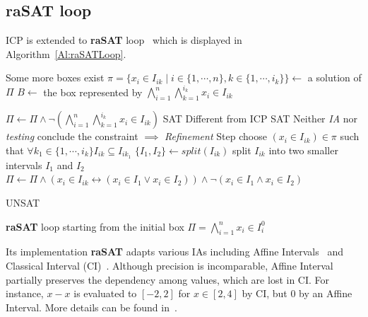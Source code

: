 \documentclass[runningheads,a4paper,oribibl]{llncs}
\begin{document}
\subsection{raSAT loop}
ICP is extended to {\bf raSAT} loop~\cite{VanKhanh201227} which is displayed in Algorithm~\ref{Al:raSATLoop}.  
\begin{algorithm}[hb]
\begin{algorithmic}[1]
 \Comment Some more boxes exist
\State $\pi = \{x_i \in I_{ik} \mid i \in \{1,\cdots, n\}, k \in \{1,\cdots, i_k\} \} \gets $
a solution of $\Pi$ 	
\State $B \gets $ the box represented by
$\bigwedge\limits_{i=1}^n\bigwedge\limits_{k=1}^{i_k}x_i \in I_{ik}$

\State $\Pi \gets \Pi \wedge \neg(\bigwedge\limits_{i=1}^n\bigwedge\limits_{k=1}^{i_k}x_i \in I_{ik})$
\State \Return SAT
   \Comment Different from ICP
\State \Return SAT
\Else \Comment Neither \emph{IA} nor \emph{testing} conclude the constraint $\implies$
\emph{Refinement} Step
\State choose $(x_i \in I_{ik}) \in \pi$ such that $\forall k_1 \in \{1,\cdots, i_k\} I_{ik} \subseteq I_{ik_1}$
\State $\{I_1, I_2\} \gets split(I_{ik})$ \Comment split $I_{ik}$
into two smaller intervals $I_1$ and $I_2$
\State $\Pi \gets \Pi \wedge (x_i \in I_{ik} \leftrightarrow (x_i \in I_1 \vee x_i \in I_2))
\wedge \neg(x_i \in I_1 \wedge x_i \in I_2)$

\EndIf
\EndWhile
\State \Return UNSAT
\end{algorithmic}
\caption{\textbf{raSAT} loop starting from the initial box
  $\Pi = \bigwedge\limits_{i=1}^n x_i \in I_i^0$}
\label{Al:raSATLoop}
\end{algorithm}

%
Its implementation {\bf raSAT} adapts various IAs including
Affine Intervals~\cite{Comba93affinearithmetic} and Classical Interval (CI)~\cite{moore}. 
Although precision is incomparable, 
Affine Interval partially preserves the dependency among values, which are lost in CI. 
For instance, $x - x$ is evaluated to $[-2,2]$ for $x \in [2,4]$ by CI, but $0$ by an Affine Interval. More details can be found in~\cite{VanKhanh201227}.
\end{document}
